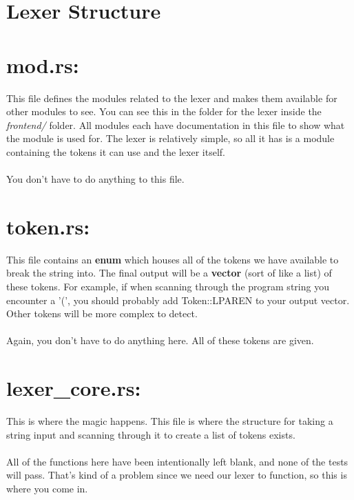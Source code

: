 \documentclass[
	12pt, %
]{fphw}
\begin{document}
\pagebreak

\section*{Lexer Structure}




\section*{mod.rs:}
This file defines the modules related to the lexer and makes them available for other modules to see. You can see this in the folder for the lexer inside the \textit{frontend/} folder. All modules each have documentation in this file to show what the module is used for. The lexer is relatively simple, so all it has is a module containing the tokens it can use and the lexer itself.\\
\\
You don't have to do anything to this file.

\section*{token.rs:}
This file contains an \textbf{enum} which houses all of the tokens we have available to break the string into. The final output will be a \textbf{vector} (sort of like a list) of these tokens. For example, if when scanning through the program string you encounter a '(', you should probably add Token::LPAREN to your output vector. Other tokens will be more complex to detect.\\
\\
Again, you don't have to do anything here. All of these tokens are given.

\section*{lexer\_core.rs:}
This is where the magic happens. This file is where the structure for taking a string input and scanning through it to create a list of tokens exists. \\
\\
All of the functions here have been intentionally left blank, and none of the tests will pass. That's kind of a problem since we need our lexer to function, so this is where you come in. 
\end{document}
